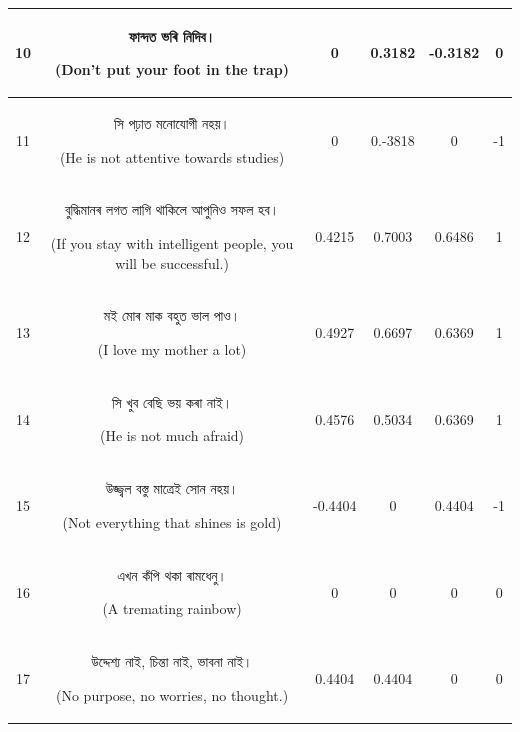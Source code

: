 \documentclass[conference]{IEEEtran}
\begin{document}
\begin{table}[htbp]
{\begin{tabular}{|c|c|c|c|c|c|}
      \hline
    10 & \begin{bengali} ফান্দত ভৰি নিদিব।\end{bengali} (Don't put your foot in the trap) & 0 & 0.3182 & -0.3182 & 0 \\
      \hline
    11 & \begin{bengali}সি পঢ়াত মনোযোগী নহয়।\end{bengali} (He is not attentive towards studies) & 0 & 0.-3818 & 0 & -1 \\
      \hline
    12 & \begin{bengali} বুদ্ধিমানৰ লগত লাগি থাকিলে আপুনিও সফল হব।\end{bengali} (If you stay with intelligent people, you will be successful.) & 0.4215 &  0.7003 & 0.6486 & 1 \\
      \hline
    13 & \begin{bengali} মই মোৰ মাক বহুত ভাল পাও।\end{bengali} (I love my mother a lot) & 0.4927 & 0.6697 & 0.6369 & 1 \\
      \hline
    14 & \begin {bengali} সি খুব বেছি ভয় কৰা নাই। \end{bengali} (He is not much afraid) & 0.4576  & 0.5034 & 0.6369 & 1 \\
      \hline
    15 & \begin{bengali} উজ্জ্বল বস্তু মাত্ৰেই সোন নহয়।\end{bengali}(Not everything that shines is gold) & -0.4404 & 0 & 0.4404 & -1 \\
      \hline
    16 & \begin{bengali} এখন কঁপি থকা ৰামধেনু। \end{bengali} (A tremating rainbow) & 0 & 0 & 0 & 0 \\
      \hline
    17 & \begin{bengali} উদ্দেশ্য নাই, চিন্তা নাই, ভাবনা নাই। \end{bengali} (No purpose, no worries, no thought.) & 0.4404 & 0.4404 & 0 & 0 \\
    \hline
\end{tabular}
}
\label{tab1}
\end{table}
\end{document}
